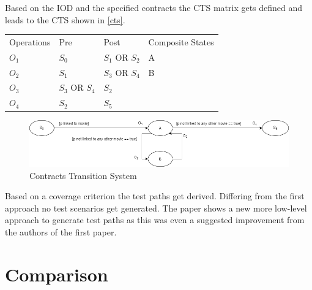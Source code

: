 \newpage

Based on the IOD and the specified contracts the CTS matrix gets defined and leads to the CTS shown in \autoref{cts}.

\begin{longtable}[h]{llll}
	Operations & Pre & Post & Composite States \\
	$O_{1}$ & $S_{0}$ & $S_{1}$ OR $S_{2}$ & A \\
	$O_{2}$ & $S_{1}$ & $S_{3}$ OR $S_{4}$ & B \\
	$O_{3}$ & $S_{3}$ OR $S_{4}$ & $S_{2}$ & \\
	$O_{4}$ & $S_{2}$ & $S_{5}$ & \\
\end{longtable}

\begin{figure}[h]
	\centering
	\includegraphics[width=\textwidth]{./images/cts.png}
	\caption{Contracts Transition System}
	\label{cts}
\end{figure}

Based on a coverage criterion the test paths get derived. Differing from the first approach no test scenarios get generated. The paper shows a new more low-level approach to generate test paths as this was even a suggested improvement from the authors of the first paper. 

\section{Comparison} \label{comparison}

